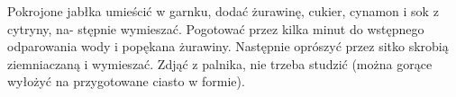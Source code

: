 \documentclass[12pt, letterpaper, titlepage]{article}
\begin{document}
\noindent Pokrojone jabłka umieścić w garnku, dodać żurawinę, cukier, cynamon i sok z cytryny, na-
stępnie wymieszać. Pogotować przez kilka minut do wstępnego odparowania wody i popękana
żurawiny. Następnie oprószyć przez sitko skrobią ziemniaczaną i wymieszać. Zdjąć z palnika,
nie trzeba studzić (można gorące wyłożyć na przygotowane ciasto w formie).\\
\end{document}
